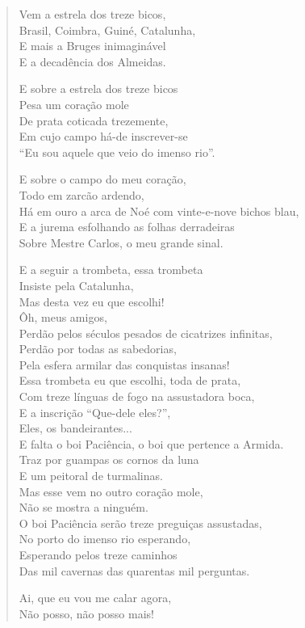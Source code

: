 \begin{verse}
Vem a estrela dos treze bicos,\\
Brasil, Coimbra, Guiné, Catalunha,\\
E mais a Bruges inimaginável\\
E a decadência dos Almeidas.

E sobre a estrela dos treze bicos\\
Pesa um coração mole\\
De prata coticada trezemente,\\
Em cujo campo há-de inscrever-se\\
``Eu sou aquele que veio do imenso rio''.

E sobre o campo do meu coração,\\
Todo em zarcão ardendo,\\
Há em ouro a arca de Noé com vinte-e-nove bichos blau,\\
E a jurema esfolhando as folhas derradeiras\\
Sobre Mestre Carlos, o meu grande sinal.

E a seguir a trombeta, essa trombeta\\
Insiste pela Catalunha,\\
Mas desta vez eu que escolhi!\\
Ôh, meus amigos,\\
Perdão pelos séculos pesados de cicatrizes infinitas,\\
Perdão por todas as sabedorias,\\
Pela esfera armilar das conquistas insanas!\\
Essa trombeta eu que escolhi, toda de prata,\\
Com treze línguas de fogo na assustadora boca,\\
E a inscrição ``Que-dele eles?'',\\
Eles, os bandeirantes...\\
E falta o boi Paciência, o boi que pertence a Armida.\\
Traz por guampas os cornos da luna\\
E um peitoral de turmalinas.\\
Mas esse vem no outro coração mole,\\
Não se mostra a ninguém.\\
O boi Paciência serão treze preguiças assustadas,\\
No porto do imenso rio esperando,\\
Esperando pelos treze caminhos\\
Das mil cavernas das quarentas mil perguntas.

Ai, que eu vou me calar agora,\\
Não posso, não posso mais!
\end{verse}

